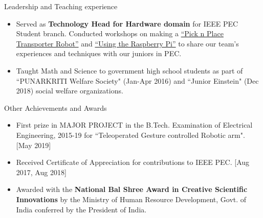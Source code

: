 \documentclass{resume} %
\begin{document}
\begin{rSection}{Leadership and Teaching experience}
    \begin{itemize}[noitemsep]
        \item Served as \textbf{Technology Head for Hardware domain} for IEEE PEC Student branch. Conducted workshops on making a \href{https://docs.google.com/presentation/d/1S5m1-T_FwgWlozkAPxEApmysL8GTYTOgqf74s8e22AQ/edit?usp=sharing}{``Pick n Place Transporter Robot”} and \href{https://docs.google.com/presentation/d/1Lp63CP2ys-AARjI1SNoRbv4Ltul11msakgCspnLZ9P0/edit?usp=sharing}{``Using the Raspberry Pi”} to share our team’s experiences and techniques with our juniors in PEC.
        \item Taught Math and Science to government high school students as part of ``PUNARKRITI Welfare Society" (Jan-Apr 2016) and ``Junior Einstein" (Dec 2018) social welfare organizations.
    \end{itemize}
\end{rSection}

\begin{rSection}{Other Achievements and Awards} 
    \begin{itemize}[noitemsep]
        \item First prize in MAJOR PROJECT in the B.Tech. Examination of Electrical Engineering, 2015-19 for ``Teleoperated Gesture controlled Robotic arm". [May 2019]
        \item Received Certificate of Appreciation for contributions to IEEE PEC. [Aug 2017, Aug 2018]
        \item Awarded with the \textbf{National Bal Shree Award in Creative Scientific Innovations} by the Ministry of Human Resource Development, Govt. of India conferred by the President of India.
    \end{itemize}
\end{rSection}
\end{document}
